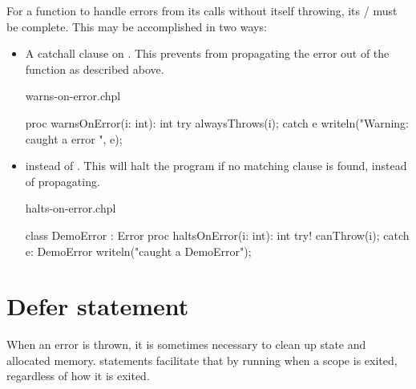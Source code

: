 For a function to handle errors from its calls without itself throwing,
its / must be complete. This may be accomplished
in two ways:

\begin{itemize}

\item A catchall clause on . This prevents  from
propagating the error out of the function as described above.

\begin{chapelexample}{warns-on-error.chpl}
\begin{chapel}
proc warnsOnError(i: int): int {
  try {
    alwaysThrows(i);
  } catch e {
    writeln("Warning: caught a error ", e);
  }
}
\end{chapel}
\begin{chapelpost}
\end{chapelpost}
\begin{chapeloutput}
\end{chapeloutput}
\end{chapelexample}

\item
{} instead of . This will halt the program if no matching
 clause is found, instead of propagating.

\begin{chapelexample}{halts-on-error.chpl}
\begin{chapel}
class DemoError : Error { }
proc haltsOnError(i: int): int {
  try! {
    canThrow(i);
  } catch e: DemoError {
    writeln("caught a DemoError");
  }
}
\end{chapel}
\begin{chapelpost}
\end{chapelpost}
\begin{chapeloutput}
\end{chapeloutput}
\end{chapelexample}

\end{itemize}


\section{Defer statement}
\label{Errors_defer}

When an error is thrown, it is sometimes necessary to clean up state and
allocated memory.  statements facilitate that by running when a
scope is exited, regardless of how it is exited.

